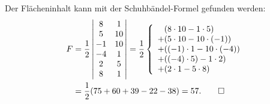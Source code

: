 \begin{loesung}
Der Flächeninhalt kann mit der Schuhbändel-Formel gefunden werden:
\begin{align*}
F&=\frac12\left|\,\begin{matrix}
8&1\\
5&10\\
-1&10\\
-4&1\\
2&5\\
8&1
\end{matrix}\,\right|
=
\frac12
\left\{
\begin{array}{l}
\phantom{+} (8\cdot 10 - 1\cdot 5)
\\
+ (5\cdot 10-10\cdot (-1))
\\
+ ((-1)\cdot 1-10\cdot(-4))
\\
+((-4)\cdot 5)-1\cdot 2)
\\
+(2\cdot 1-5\cdot 8)
\end{array}
\right.
\\
&=
\frac12(
75 +60 +39 -22 -38)
=57.
\qedhere
\end{align*}
\end{loesung}

